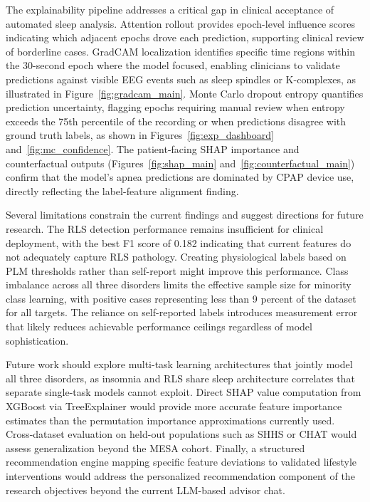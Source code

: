 \documentclass{ieeetj}
\begin{document}
The explainability pipeline addresses a critical gap in clinical acceptance of automated sleep analysis. Attention rollout provides epoch-level influence scores indicating which adjacent epochs drove each prediction, supporting clinical review of borderline cases. GradCAM localization identifies specific time regions within the 30-second epoch where the model focused, enabling clinicians to validate predictions against visible EEG events such as sleep spindles or K-complexes, as illustrated in Figure~\ref{fig:gradcam_main}. Monte Carlo dropout entropy quantifies prediction uncertainty, flagging epochs requiring manual review when entropy exceeds the 75th percentile of the recording or when predictions disagree with ground truth labels, as shown in Figures~\ref{fig:exp_dashboard} and~\ref{fig:mc_confidence}. The patient-facing SHAP importance and counterfactual outputs (Figures~\ref{fig:shap_main} and~\ref{fig:counterfactual_main}) confirm that the model's apnea predictions are dominated by CPAP device use, directly reflecting the label-feature alignment finding.

Several limitations constrain the current findings and suggest directions for future research. The RLS detection performance remains insufficient for clinical deployment, with the best F1 score of 0.182 indicating that current features do not adequately capture RLS pathology. Creating physiological labels based on PLM thresholds rather than self-report might improve this performance. Class imbalance across all three disorders limits the effective sample size for minority class learning, with positive cases representing less than 9 percent of the dataset for all targets. The reliance on self-reported labels introduces measurement error that likely reduces achievable performance ceilings regardless of model sophistication.

Future work should explore multi-task learning architectures that jointly model all three disorders, as insomnia and RLS share sleep architecture correlates that separate single-task models cannot exploit. Direct SHAP value computation from XGBoost via TreeExplainer would provide more accurate feature importance estimates than the permutation importance approximations currently used. Cross-dataset evaluation on held-out populations such as SHHS or CHAT would assess generalization beyond the MESA cohort. Finally, a structured recommendation engine mapping specific feature deviations to validated lifestyle interventions would address the personalized recommendation component of the research objectives beyond the current LLM-based advisor chat.
\end{document}
